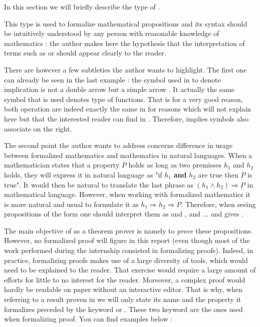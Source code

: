 In this section we will briefly describe the  type of \Lean.

This type is used to formalize mathematical propositions and its syntax should be intuitively understood by any person with reasonable knowledge of mathematics : the author makes here the hypothesis that the interpretation of terms such as  or  should appear clearly to the reader.
    
There are however a few subtleties the author wants to highlight. The first one can already be seen in the last example : the symbol used in \Lean to denote implication is not a double arrow  but a simple arrow . It actually the same symbol that is used denotes type of functions. That is for a very good reason, both operation are indeed exactly the same in \Lean for reasons which will not explain here but that the interested reader can find in \cite{noauthor_theorem_nodate}. Therefore, implies symbols also associate on the right. 

The second point the author wants to address concerns difference in usage between formalized mathematics and mathematics in natural languages. When a mathematician states that a property $P$ holds as long as two premisses $h_1$ and $h_2$ holds, they will express it in natural language as "if $h_1$ \textbf{and} $h_2$ are true then $P$ is true". It would then be natural to translate the last phrase as $(h_1 \land h_2) \Rightarrow P$ in mathematical language. However, when working with formalized mathematics it is more natural and usual to formulate it as $h_1 \Rightarrow h_2 \Rightarrow P$. Therefore, when seeing propositions of the form  one should interpret them as  and , and ... and  gives .

The main objective of \Lean as a theorem prover is namely to \emph{prove} these propositions. However, no formalized proof will figure in this report (even though most of the work performed during the internship consisted in formalizing proofs). Indeed, in practice, formalizing proofs makes use of a large diversity of tools, which would need to be explained to the reader. That exercise would require a large amount of efforts for little to no interest for the reader. Moreover, a complex \Lean proof would hardly be readable on paper without an interactive editor. That is why, when referring to a result proven in \Lean we will only state its name and the property it formalizes preceded by the keyword  or . These two keyword are the ones used when formalizing proof. You can find examples below :

